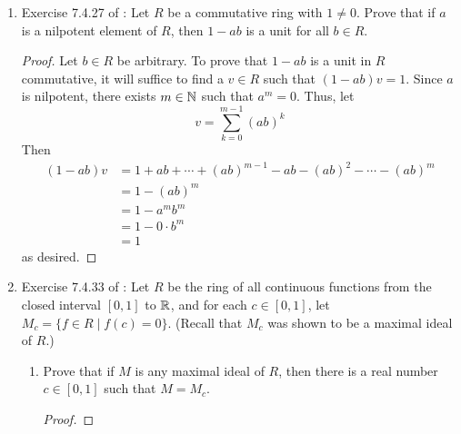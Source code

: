 \documentclass[../psets.tex]{subfiles}
\begin{document}
\begin{enumerate}
\begin{enumerate}[label={\textbf{(\alph*)}}]
\begin{proof}
            \begin{equation*}
                bj = \varphi(a)\varphi(i)
                = \varphi(ai)
                \in J
            \end{equation*}
            Therefore, $bJ\subset J$, as desired. An analogous argument verifies that $Jb\subset J$ for all $b\in S$.\par\smallskip
            Consider $\varphi:\Z\to\Z$ defined by $\varphi(z)=z\bmod 3$. Then $\varphi(2\Z)=\{0,1,2\}$. Taking $a=2$, for example, shows that $\varphi(2\Z)$ is not closed under multiplication since $a2=4\notin\varphi(2\Z)$.
        \end{proof}
    \end{enumerate}
    \item Exercise 7.4.27 of \textcite{bib:DummitFoote}: Let $R$ be a commutative ring with $1\neq 0$. Prove that if $a$ is a nilpotent element of $R$, then $1-ab$ is a unit for all $b\in R$.
    \begin{proof}
        Let $b\in R$ be arbitrary. To prove that $1-ab$ is a unit in $R$ commutative, it will suffice to find a $v\in R$ such that $(1-ab)v=1$. Since $a$ is nilpotent, there exists $m\in\mathbb{N}$ such that $a^m=0$. Thus, let
        \begin{equation*}
            v = \sum_{k=0}^{m-1}(ab)^k
        \end{equation*}
        Then
        \begin{align*}
            (1-ab)v &= 1+ab+\cdots+(ab)^{m-1}-ab-(ab)^2-\cdots-(ab)^m\\
            &= 1-(ab)^m\\
            &= 1-a^mb^m\\
            &= 1-0\cdot b^m\\
            &= 1
        \end{align*}
        as desired.
    \end{proof}
    \item Exercise 7.4.33 of \textcite{bib:DummitFoote}: Let $R$ be the ring of all continuous functions from the closed interval $[0,1]$ to $\mathbb{R}$, and for each $c\in[0,1]$, let $M_c=\{f\in R\mid f(c)=0\}$. (Recall that $M_c$ was shown to be a maximal ideal of $R$.)
    \begin{enumerate}[label={\textbf{(\alph*)}}]
        \item Prove that if $M$ is any maximal ideal of $R$, then there is a real number $c\in[0,1]$ such that $M=M_c$.
        \begin{proof}


\end{proof}
\end{enumerate}
\end{enumerate}
\end{document}

